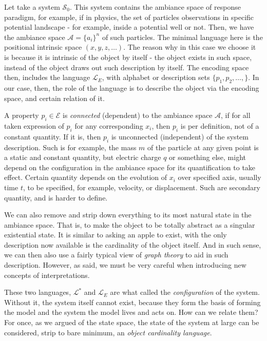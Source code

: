 Let take a system $\mathcal{S}_{0}$. This system contains the ambiance space of response paradigm, for example, if in physics, the set of particles observations in specific potential landscape - for example, inside a potential well or not. Then, we have the ambiance space $\mathcal{A}=\{a_{i}\}^{n}$ of such particles. The minimal language here is the positional intrinsic space $(x,y,z,\dots)$. The reason why in this case we choose it is because it is intrinsic of the object by itself - the object exists in such space, instead of the object draws out such description by itself. The encoding space then, includes the language $\mathcal{L}_{E}$, with alphabet or description sets $\{p_{1},p_{2},\dots,\}$. In our case, then, the role of the language is to describe the object via the encoding space, and certain relation of it. 

A property $p_{i}\in \mathcal{E}$ is \textit{connected} (dependent) to the ambiance space $\mathcal{A}$, if for all taken expression of $p_{i}$ for any corresponding $x_{i}$, then $p_{i}$ is per definition, not of a constant quantity. If it is, then $p_{i}$ is unconnected (independent) of the system description. Such is for example, the mass $m$ of the particle at any given point is a static and constant quantity, but electric charge $q$ or something else, might depend on the configuration in the ambiance space for its quantification to take effect. Certain quantity depends on the evolution of $x_{i}$ over specified axis, usually time $t$, to be specified, for example, velocity, or displacement. Such are secondary quantity, and is harder to define. 

We can also remove and strip down everything to its most natural state in the ambiance space. That is, to make the object to be totally abstract as a singular existential state. It is similar to asking an apple to exist, with the only description now available is the cardinality of the object itself. And in such sense, we can then also use a fairly typical view of \textit{graph theory} to aid in such description. However, as said, we must be very careful when introducing new concepts of interpretations. 

These two languages, $\mathcal{L}^{*}$ and $\mathcal{L}_{E}$ are what called the \textit{configuration} of the system. Without it, the system itself cannot exist, because they form the basis of forming the model and the system the model lives and acts on. How can we relate them? For once, as we argued of the state space, the state of the system at large can be considered, strip to bare minimum, an \textit{object cardinality language}. 

